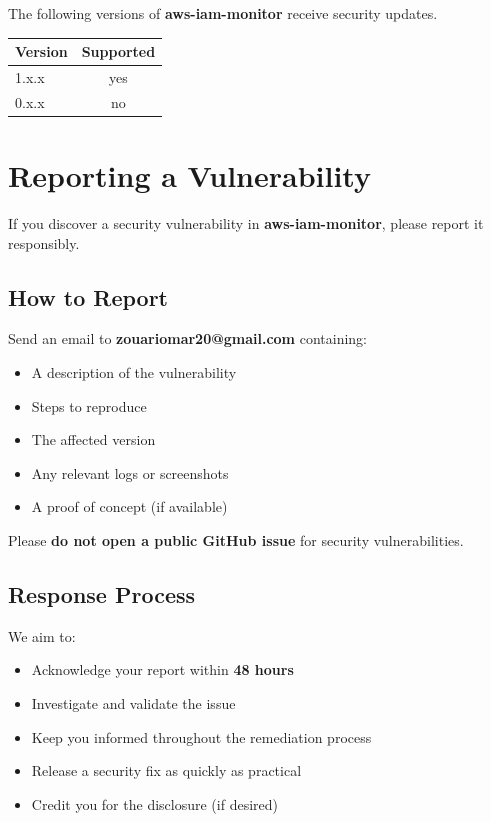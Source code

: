 \documentclass[11pt,a4paper]{report}
\begin{document}
The following versions of \textbf{aws-iam-monitor} receive security updates.

\begin{center}
\renewcommand{\arraystretch}{1.3}
\begin{tabularx}{0.5\linewidth}{X c}
\toprule
\textbf{Version} & \textbf{Supported} \\
\midrule
1.x.x & yes \\
0.x.x & no \\
\bottomrule
\end{tabularx}
\end{center}

\section{Reporting a Vulnerability}

If you discover a security vulnerability in \textbf{aws-iam-monitor}, please
report it responsibly.

\subsection{How to Report}

Send an email to \textbf{zouariomar20@gmail.com} containing:

\begin{itemize}[leftmargin=1.4em]
  \item A description of the vulnerability
  \item Steps to reproduce
  \item The affected version
  \item Any relevant logs or screenshots
  \item A proof of concept (if available)
\end{itemize}

Please \textbf{do not open a public GitHub issue} for security
vulnerabilities.

\subsection{Response Process}

We aim to:

\begin{itemize}[leftmargin=1.4em]
  \item Acknowledge your report within \textbf{48 hours}
  \item Investigate and validate the issue
  \item Keep you informed throughout the remediation process
  \item Release a security fix as quickly as practical
  \item Credit you for the disclosure (if desired)
\end{itemize}
\end{document}
